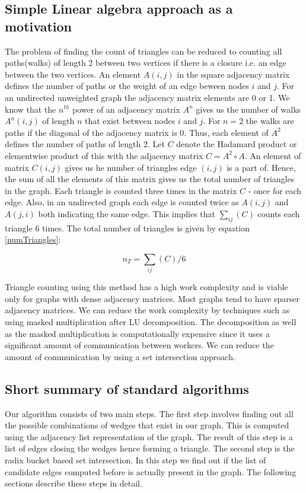 \documentclass[conference]{IEEEtran}
\begin{document}
\subsection{Simple Linear algebra approach as a motivation}
The problem of finding the count of triangles can be reduced to counting all paths(walks) of length 2 between two vertices if there is a closure i.e. an edge between the two vertices. An element $A(i,j)$ in the square adjacency matrix defines the number of paths or the weight of an edge beween nodes $i$ and $j$. For an undirected unweighted graph the adjacency matrix elements are 0 or 1. We know that the $n^{th}$ power of an adjacency matrix $A^n$ gives us the number of walks $A^n(i,j)$ of length $n$ that exist between nodes $i$ and $j$. For $n=2$ the walks are paths if the diagonal of the adjacency matrix is 0. Thus, each element of $A^2$ defines the number of paths of length 2. Let $C$ denote the Hadamard product or elementwise product of this with the adjacency matrix $C=A^2\circ A$. An element of matrix $C(i,j)$ gives us he number of triangles edge $(i,j)$ is a part of. Hence, the sum of all the elements of this matrix gives us the total number of triangles in the graph. Each triangle is counted three times in the matrix $C$ - once for each edge. Also, in an undirected graph each edge is counted twice as $A(i,j)$ and $A(j,i)$ both indicating the same edge. This implies that $\sum_{ij}(C)$ counts each triangle $6$ times. The total number of triangles is given by equation \ref{numTriangles}:

\begin{equation}
 n_{T} = \sum_{ij}(C)/6 \label{numTriangles}
\end{equation}

Triangle counting using this method has a high work complexity and is viable only for graphs with dense adjacency matrices. Most graphs tend to have sparser adjacency matrices. We can reduce the work complexity by techniques such as using masked multiplication after LU decomposition\cite{b10}. The decomposition as well as the masked multiplication is computationally expensive since it uses a significant amount of communication between workers. We can reduce the amount of communication by using a set intersection approach.

\subsection{Short summary of standard algorithms}
Our algorithm consists of two main steps. The first step involves finding out all the possible combinations of wedges that exist in our graph. This is computed using the adjacency list representation of the graph. The result of this step is a list of edges closing the wedges hence forming a triangle. The second step is the radix bucket based set intersection. In this step we find out if the list of candidate edges computed before is actually present in the graph. The following sections describe these steps in detail.
\end{document}
